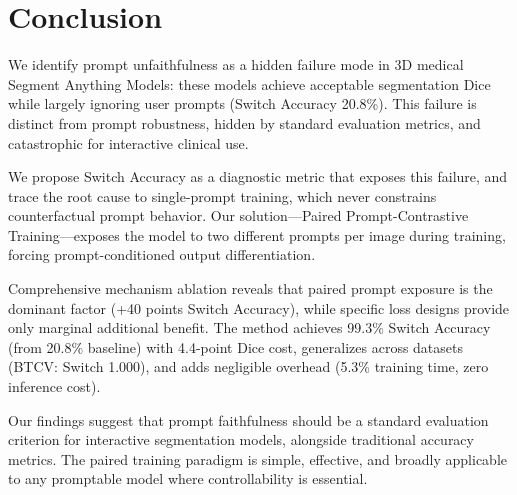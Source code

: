\section{Conclusion}

We identify prompt unfaithfulness as a hidden failure mode in 3D medical Segment Anything Models: these models achieve acceptable segmentation Dice while largely ignoring user prompts (Switch Accuracy 20.8\%). This failure is distinct from prompt robustness, hidden by standard evaluation metrics, and catastrophic for interactive clinical use.

We propose Switch Accuracy as a diagnostic metric that exposes this failure, and trace the root cause to single-prompt training, which never constrains counterfactual prompt behavior. Our solution---Paired Prompt-Contrastive Training---exposes the model to two different prompts per image during training, forcing prompt-conditioned output differentiation.

Comprehensive mechanism ablation reveals that paired prompt exposure is the dominant factor (+40 points Switch Accuracy), while specific loss designs provide only marginal additional benefit. The method achieves 99.3\% Switch Accuracy (from 20.8\% baseline) with 4.4-point Dice cost, generalizes across datasets (BTCV: Switch 1.000), and adds negligible overhead (5.3\% training time, zero inference cost).

Our findings suggest that prompt faithfulness should be a standard evaluation criterion for interactive segmentation models, alongside traditional accuracy metrics. The paired training paradigm is simple, effective, and broadly applicable to any promptable model where controllability is essential.
